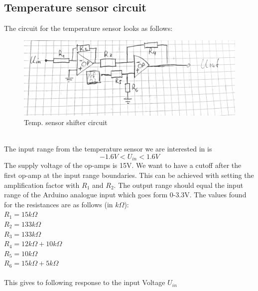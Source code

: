 \documentclass[12pt]{scrartcl}
\begin{document}
    \subsection{Temperature sensor circuit}
      The circuit for the temperature sensor looks as follows:
      \begin{figure}[h]
        \includegraphics[width = \textwidth]{circ.png}
        \caption{Temp. sensor shifter circuit}
        \label{fig1}
      \end{figure}
      \\The input range from the temperature sensor we are interested in is
      $$-1.6V < U_{in} < 1.6V$$
      The supply voltage of the op-amps is 15V. We want to have a cutoff after
      the first op-amp at the input range boundaries. This can be achieved with
      setting the amplification factor with $R_1$ and $R_2$. The output range
      should equal the input range of the Arduino analogue input which goes form
      0-3.3V. The values found for the resistances are as follows (in $k\Omega$):
      \\
      $R_1 = 15k\Omega$ \\ $R_2 = 133k\Omega$ \\ $R_3 = 133k\Omega$ \\
      $R_4 = 12k\Omega + 10k\Omega$ \\ $R_5 = 10k\Omega$ \\
      $R_6 = 15k\Omega + 5k\Omega$ \\
      \\This gives to following response to the input Voltage $U_{in}$\\
\end{document}
